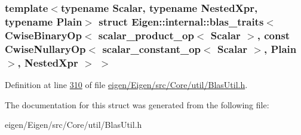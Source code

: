 \subsubsection*{template$<$typename Scalar, typename Nested\+Xpr, typename Plain$>$\newline
struct Eigen\+::internal\+::blas\+\_\+traits$<$ Cwise\+Binary\+Op$<$ scalar\+\_\+product\+\_\+op$<$ Scalar $>$, const Cwise\+Nullary\+Op$<$ scalar\+\_\+constant\+\_\+op$<$ Scalar $>$, Plain $>$, Nested\+Xpr $>$ $>$}



Definition at line \hyperlink{eigen_2_eigen_2src_2_core_2util_2_blas_util_8h_source_l00310}{310} of file \hyperlink{eigen_2_eigen_2src_2_core_2util_2_blas_util_8h_source}{eigen/\+Eigen/src/\+Core/util/\+Blas\+Util.\+h}.



The documentation for this struct was generated from the following file\+:\begin{DoxyCompactItemize}
\item 
eigen/\+Eigen/src/\+Core/util/\+Blas\+Util.\+h\end{DoxyCompactItemize}
